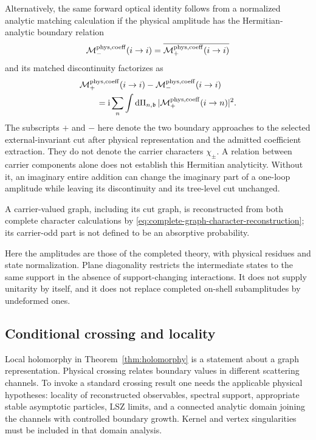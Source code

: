 \documentclass[final,5p,times,twocolumn,numbers,nopreprintline]{elsarticle}
\numberwithin{equation}{section}
\theoremstyle{definition}
\theoremstyle{remark}
\newcommand{\dd}{\mathop{}\!\mathrm d}
\newcommand{\ii}{\mathrm i}
\newcommand{\bb}{\mathfrak b}
\begin{document}
Alternatively, the same forward optical identity follows from a
normalized analytic matching calculation if the physical amplitude
has the Hermitian-analytic boundary relation
\[
 \mathcal M_-^{\rm phys,coeff}(i\to i)
   =\overline{\mathcal M_+^{\rm phys,coeff}(i\to i)}
\]
and its matched discontinuity factorizes as
\[
\begin{aligned}
 &\mathcal M_+^{\rm phys,coeff}(i\to i)
  -\mathcal M_-^{\rm phys,coeff}(i\to i)\\
 &\qquad=\ii\sum_n\int\dd\Pi_{n,\bb}\,
       |\mathcal M_+^{\rm phys,coeff}(i\to n)|^2.
\end{aligned}
\]
The subscripts \(+\) and \(-\) here denote the two boundary
approaches to the selected external-invariant cut after physical
representation and the admitted coefficient extraction. They do
not denote the carrier characters \(\chi_\pm\). A relation
between carrier components alone does not establish this
Hermitian analyticity. Without it, an imaginary entire addition
can change the imaginary part of a one-loop amplitude while
leaving its discontinuity and its tree-level cut unchanged.

A carrier-valued graph, including its cut graph, is reconstructed
from both complete character calculations by
\eqref{eq:complete-graph-character-reconstruction}; its carrier-odd
part is not defined to be an absorptive probability.

Here the amplitudes are those of the completed theory, with
physical residues and state normalization. Plane diagonality
restricts the intermediate states to the same support in the
absence of support-changing interactions. It does not supply
unitarity by itself, and it does not replace completed on-shell
subamplitudes by undeformed ones.

\subsection{Conditional crossing and locality}

Local holomorphy in Theorem~\ref{thm:holomorphy} is a statement
about a graph representation. Physical crossing relates boundary
values in different scattering channels. To invoke a standard
crossing result one needs the applicable physical hypotheses:
locality of reconstructed observables, spectral support,
appropriate stable asymptotic particles, LSZ limits, and a
connected analytic domain joining the channels with controlled
boundary growth. Kernel and vertex singularities must be
included in that domain analysis.
\end{document}
